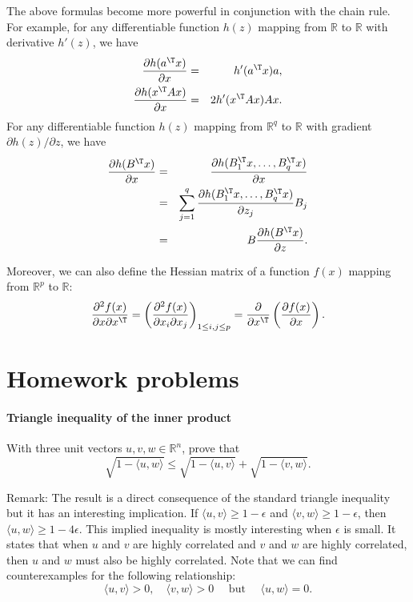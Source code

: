 The above formulas become more powerful in conjunction with the chain rule. For example, for any differentiable function $h(z)$ mapping from $\mathbb{R} $ to $ \mathbb{R}$ with derivative $h'(z)$, we have
\begin{eqnarray*}
\frac{ \partial h (a^{\T} x)  }{\partial  x}  &=& h'(a^{\T} x)  a,\\ 
\frac{ \partial  h( x^{\T} A x) }{ \partial  x} &=& 2h'( x^{\T} A x) Ax.
\end{eqnarray*}
For any differentiable function $h(z)$ mapping from $ \mathbb{R}^q $ to $ \mathbb{R}$ with gradient 
$\partial h(z) / \partial z$, we have
\begin{eqnarray*}
\frac{\partial h(B^{\T} x)  }{\partial  x} 
&=& \frac{\partial h(B_1^{\T} x, \ldots, B_q^{\T}x)  }{\partial  x} \\
&=& \sum_{j=1}^q \frac{\partial h(B_1^{\T} x, \ldots, B_q^{\T}x)  }{\partial  z_j} B_j \\
&=&  B \frac{ \partial h(B^{\T} x) }{  \partial z } . 
\end{eqnarray*}

Moreover, we can also define the Hessian matrix of a function $f(x)$ mapping from $\mathbb{R}^p$ to $\mathbb{R}$:
$$
\frac{  \partial^2 f(x) }{ \partial x \partial x^{\T} } = \left( \frac{  \partial^2 f(x) }{ \partial x_i \partial x_j} \right)_{1\leq i, j \leq p}
= \frac{ \partial }{ \partial x^{\T} } \left(  \frac{  \partial f(x) }{ \partial x }  \right). 
$$


\section{Homework problems}


\paragraph{Triangle inequality of the inner product}\label{hwmath1::triangle-inner-product}

With three unit vectors $u, v, w  \in \mathbb{R}^n$, prove that
$$
\sqrt{ 1 -  \langle  u, w  \rangle } \leq \sqrt{  1 -   \langle  u, v  \rangle } + \sqrt{  1 -   \langle   v, w  \rangle }.
$$


Remark: The result is a direct consequence of the standard triangle inequality but it has an interesting implication. If $ \langle  u, v  \rangle  \geq 1-\epsilon$ and  $  \langle   v, w  \rangle \geq 1 - \epsilon$, then $\langle  u, w  \rangle \geq 1-4\epsilon$. This implied inequality is mostly interesting when $\epsilon $ is small. It states that when $u$ and $v$ are highly correlated and $v$ and $w$ are highly correlated, then $u$ and $w$ must also be highly correlated. Note that we can find counterexamples for the following relationship:
$$
\langle  u, v  \rangle > 0, \quad  \langle   v, w  \rangle  > 0 \quad   \text{ but }\quad   \langle  u, w  \rangle = 0. 
$$



